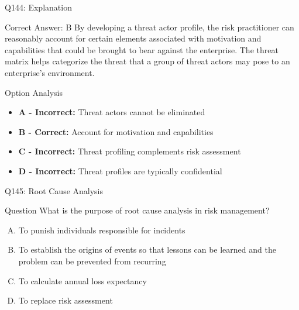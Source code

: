 \documentclass{beamer}
\begin{document}
	\begin{frame}{Q144: Explanation}
		\begin{block}{Correct Answer: B}
			By developing a threat actor profile, the risk practitioner can reasonably account for certain elements associated with motivation and capabilities that could be brought to bear against the enterprise. The threat matrix helps categorize the threat that a group of threat actors may pose to an enterprise's environment.
		\end{block}
		\begin{block}{Option Analysis}
			\begin{itemize}
				\item \textbf{A - Incorrect:} Threat actors cannot be eliminated
				\item \textbf{B - Correct:} Account for motivation and capabilities
				\item \textbf{C - Incorrect:} Threat profiling complements risk assessment
				\item \textbf{D - Incorrect:} Threat profiles are typically confidential
			\end{itemize}
		\end{block}
	\end{frame}
	
	\begin{frame}{Q145: Root Cause Analysis}
		\begin{block}{Question}
			What is the purpose of root cause analysis in risk management?
		\end{block}
		\begin{enumerate}
			[(A)]
			\item To punish individuals responsible for incidents
			\item To establish the origins of events so that lessons can be learned and the problem can be prevented from recurring
			\item To calculate annual loss expectancy
			\item To replace risk assessment
		\end{enumerate}
	\end{frame}
	
\end{document}
